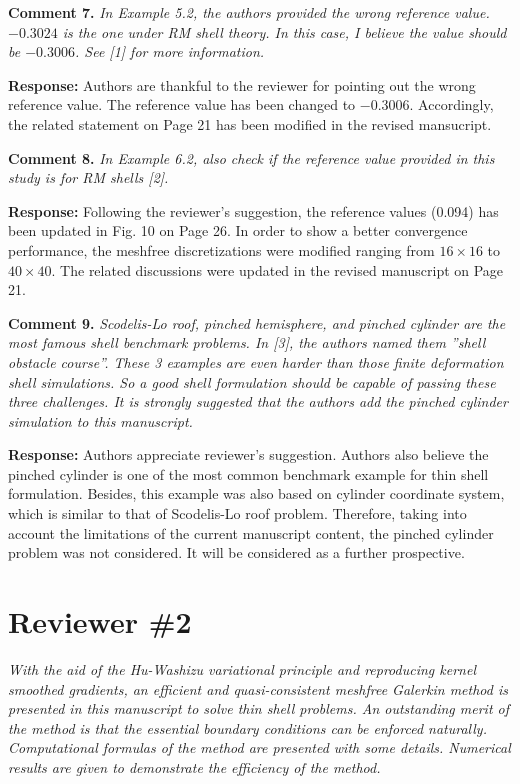 \documentclass{article}
\begin{document}
\textbf{Comment 7.} \textit{In Example 5.2, the authors provided the wrong reference value. $-0.3024$ is the one under RM shell theory. In this case, I believe the value should be $-0.3006$. See [1] for more information.}

\textbf{Response:} Authors are thankful to the reviewer for pointing out the wrong reference value. The reference value has been changed to $-0.3006$. Accordingly, the related statement on Page 21 has been modified in the revised mansucript.

\textbf{Comment 8.} \textit{In Example 6.2, also check if the reference value provided in this study is for RM shells [2].}

\textbf{Response:} Following the reviewer's suggestion, the reference values (0.094) has been updated in Fig. 10 on Page 26. In order to show a better convergence performance, the meshfree discretizations were modified ranging from $16\times16$ to $40\times40$. The related discussions were updated in the revised manuscript on Page 21. 

\textbf{Comment 9.} \textit{Scodelis-Lo roof, pinched hemisphere, and pinched cylinder are the most famous shell benchmark problems. In [3], the authors named them ”shell obstacle course”. These 3 examples are even harder than those finite deformation shell simulations. So a good shell formulation should be capable of passing these three challenges. It is strongly suggested that the authors add the pinched cylinder simulation to this manuscript.}

\textbf{Response:} Authors appreciate reviewer's suggestion. Authors also believe the pinched cylinder is one of the most common benchmark example for thin shell formulation. Besides, this example was also based on cylinder coordinate system, which is similar to that of Scodelis-Lo roof problem. Therefore, taking into account the limitations of the current manuscript content, the pinched cylinder problem was not considered. It will be considered as a  further prospective.

\section*{Reviewer \#2}
\textit{With the aid of the Hu-Washizu variational principle and reproducing kernel smoothed gradients, an efficient and quasi-consistent meshfree Galerkin method is presented in this manuscript to solve thin shell problems. An outstanding merit of the method is that the essential boundary conditions can be enforced naturally. Computational formulas of the method are presented with some details. Numerical results are given to demonstrate the efficiency of the method.}
\end{document}
